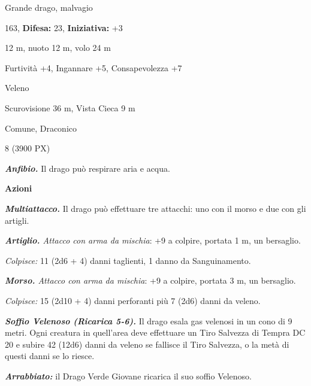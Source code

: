 \begin{multicols}{2}
{
\noindent
\begin{description}[noitemsep, topsep=0pt, parsep=0pt, partopsep=0pt, leftmargin=0cm, labelwidth=2.2cm]
	\item[\textbf{Taglia/Tipo:}] Grande drago, malvagio
	\item[\textbf{Caratt.:}] 
	\item[\textbf{Punti Ferita:}] 163,  \textbf{Difesa:} 23,  \textbf{Iniziativa:} +3
	\item[\textbf{Movimento:}] 12 m, nuoto 12 m, volo 24 m
	\item[\textbf{Tiri Salvez.:}] 
	\item[\textbf{Comp.:}] Furtività +4, Ingannare +5, Consapevolezza +7
	\item[\textbf{Imm. Danni:}] Veleno
	\item[\textbf{Sensi:}] Scurovisione 36 m, Vista Cieca 9 m
	\item[\textbf{Linguaggi:}] Comune, Draconico
	\item[\textbf{Sfida:}] 8 (3900 PX)\smallskip
\end{description}

\emph{\textbf{Anfibio.}} Il drago può respirare aria e acqua.

\textbf{Azioni}

\emph{\textbf{Multiattacco.}} Il drago può effettuare tre attacchi: uno con il morso e due con gli artigli.

\emph{\textbf{Artiglio.} Attacco con arma da mischia}: +9 a colpire, portata 1 m, un bersaglio.

\emph{Colpisce:} 11 (2d6 + 4) danni taglienti, 1 danno da Sanguinamento.

\emph{\textbf{Morso.} Attacco con arma da mischia}: +9 a colpire, portata 3 m, un bersaglio.

\emph{Colpisce:} 15 (2d10 + 4) danni perforanti più 7 (2d6) danni da veleno.

\emph{\textbf{Soffio Velenoso (Ricarica 5-6).}} Il drago esala gas velenosi in un cono di 9 metri. Ogni creatura in quell'area deve effettuare un Tiro Salvezza di Tempra DC 20 e subire 42 (12d6) danni da veleno se fallisce il Tiro Salvezza, o la metà di questi danni se lo riesce.

\emph{\textbf{Arrabbiato:}} il Drago Verde Giovane ricarica il suo soffio Velenoso.

}
\end{multicols}
